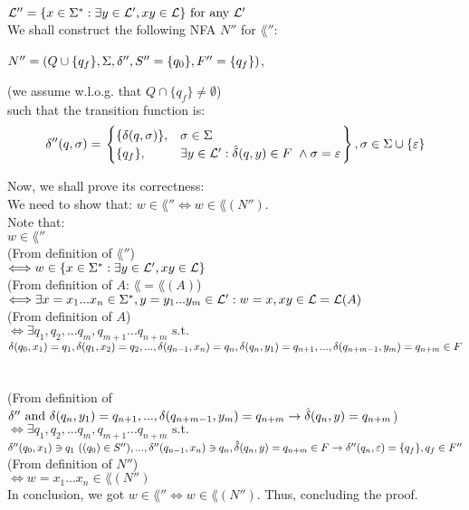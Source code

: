 $\mathcal{L}''=\{x \in \Sigma^* : \exists y \in \mathcal{L}', xy \in \mathcal{L}\} \text{ for any } \mathcal{L}'$
\\

We shall construct the following NFA $N''$ for $\lang''$:

$N''=(Q \cup \{q_f\}, \Sigma, \delta'', S''=\{q_0\}, F''=\{q_f\})$,

(we assume w.l.o.g. that $Q \cap \{q_f\} \neq \emptyset$) \\
such that the transition function is: \\
\[
    \delta''(q,\sigma) = \left.
    \begin{cases}
        \{\delta(q, \sigma)\} , & \sigma \in \Sigma                                                      \\
        \{q_f\},          & \exists y \in \mathcal{L}' : \hat{\delta}(q, y) \in F  \ \wedge \sigma=\varepsilon \\
    \end{cases}
    \right\} , \sigma \in \Sigma \cup \{\varepsilon\}
\]

Now, we shall prove its correctness: \\
We need to show that: $w \in \lang'' \Longleftrightarrow  w \in \lang(N'')$. \\
Note that: \\
$w \in \lang''$\\

(From definition of $\lang''$) \\
$\Longleftrightarrow w \in \{x \in \Sigma^* : \exists y \in \mathcal{L}', xy \in \mathcal{L}\}$ \\

(From definition of $A$: $\lang = \lang(A)$) \\
$\Longleftrightarrow \exists x=x_1...x_n \in \Sigma^*, y=y_1...y_m \in \mathcal{L}': w=x,  xy \in \mathcal{L} = \mathcal{L}(A)$\\

(From definition of $A$) \\
$\Longleftrightarrow \exists q_1,q_2,...q_m, q_{m+1}...q_{n+m} \text{ s.t. } $\\
$
    \delta(q_0,x_1)=q_1, \delta(q_1,x_2)=q_2, ..., \\
    \delta(q_{n-1},x_n)=q_n, \delta(q_n,y_1)=q_{n+1},...,\\
    \delta(q_{n+m-1},y_{m})=q_{n+m} \in F
$ \\ \\ \\

(From definition of $\delta'' \text{ and }
    \delta(q_n,y_1)=q_{n+1},...,\delta(q_{n+m-1},y_{m})=q_{n+m} \rightarrow \hat{\delta}(q_n, y)=q_{n+m}$) \\
$\Longleftrightarrow \exists q_1,q_2,...q_m, q_{m+1}...q_{n+m} \text{ s.t. } $\\
$
    \delta''(q_0,x_1) \ni q_1  \text{ } ((q_0) \in S''), ..., \\
    \delta''(q_{n-1},x_n) \ni q_n, \\
    \hat{\delta}(q_n, y)=q_{n+m} \in F \rightarrow \delta''(q_n,\varepsilon)=\{q_f\}, q_f \in F''
$ \\

(From definition of $N''$) \\
$\Longleftrightarrow w=x_1...x_n \in \lang(N'')$ \\

In conclusion, we got $w \in \lang'' \Longleftrightarrow  w \in \lang(N'')$. Thus, concluding the proof. \\


